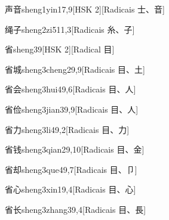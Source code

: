 \begin{entry}{声音}{sheng1yin1}{7,9}[HSK 2][Radicais ⼠、⾳]
\end{entry}

\begin{entry}{绳子}{sheng2zi5}{11,3}[Radicais ⽷、⼦]
\end{entry}

\begin{entry}{省}{sheng3}{9}[HSK 2][Radical ⽬]
\end{entry}

\begin{entry}{省城}{sheng3cheng2}{9,9}[Radicais ⽬、⼟]
\end{entry}

\begin{entry}{省会}{sheng3hui4}{9,6}[Radicais ⽬、⼈]
\end{entry}

\begin{entry}{省俭}{sheng3jian3}{9,9}[Radicais ⽬、⼈]
\end{entry}

\begin{entry}{省力}{sheng3li4}{9,2}[Radicais ⽬、⼒]
\end{entry}

\begin{entry}{省钱}{sheng3qian2}{9,10}[Radicais ⽬、⾦]
\end{entry}

\begin{entry}{省却}{sheng3que4}{9,7}[Radicais ⽬、⼙]
\end{entry}

\begin{entry}{省心}{sheng3xin1}{9,4}[Radicais ⽬、⼼]
\end{entry}

\begin{entry}{省长}{sheng3zhang3}{9,4}[Radicais ⽬、⾧]
\end{entry}

